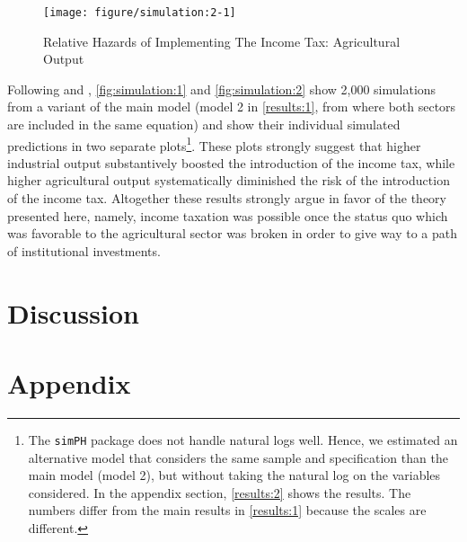 \documentclass[onesided]{article}\usepackage[]{graphicx}\usepackage[]{color}
\makeatletter
\def\maxwidth{ %
  \ifdim\Gin@nat@width>\linewidth
    \linewidth
  \else
    \Gin@nat@width
  \fi
}
\newenvironment{knitrout}{}{} %
\makeatother
\begin{document}
\begin{knitrout}
\color{fgcolor}\begin{figure}[H]

{\centering \texttt{[image: figure/simulation:2-1]} 

}

\caption[Relative Hazards of Implementing The Income Tax]{Relative Hazards of Implementing The Income Tax: Agricultural Output}\label{fig:simulation:2}
\end{figure}


\end{knitrout}


Following \citet{Gandrud2015} and \citet{King2000}, \autoref{fig:simulation:1} and \autoref{fig:simulation:2} show 2,000 simulations from a variant of the main model (model 2 in \autoref{results:1}, from where both sectors are included in the same equation) and show their individual simulated predictions in two separate plots\footnote{
	The \texttt{simPH} package does not handle natural logs well. Hence, we estimated an alternative model that considers the same sample and specification than the main model (model 2), but without taking the natural log on the variables considered. In the appendix section, \autoref{results:2} shows the results. The numbers differ from the main results in \autoref{results:1} because the scales are different.
	}. These plots strongly suggest that higher industrial output substantively boosted the introduction of the income tax, while higher agricultural output systematically diminished the risk of the introduction of the income tax. Altogether these results strongly argue in favor of the theory presented here, namely, income taxation was possible once the status quo which was favorable to the agricultural sector was  broken in order to give way to a path of institutional investments.



\section{Discussion\label{discussion}}

{\color{red}{PENDING}}


\newpage

\section{Appendix}
\end{document}
